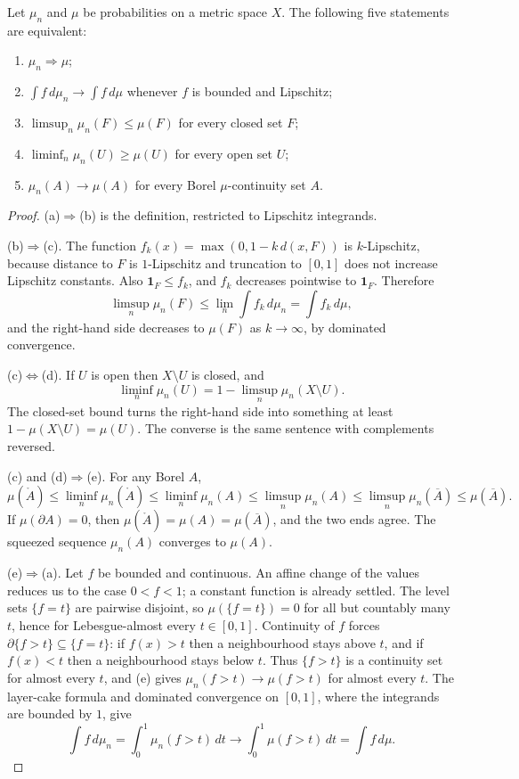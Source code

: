 \begin{theorem}[portmanteau]\label{thm:portmanteau}
Let $\mu_n$ and $\mu$ be probabilities on a metric space $X$. The following five statements are equivalent:
\begin{enumerate}[label=(\alph*)]
\item $\mu_n\Rightarrow\mu$;
\item $\int f\,d\mu_n\to\int f\,d\mu$ whenever $f$ is bounded and Lipschitz;
\item $\limsup_n\mu_n(F)\le\mu(F)$ for every closed set $F$;
\item $\liminf_n\mu_n(U)\ge\mu(U)$ for every open set $U$;
\item $\mu_n(A)\to\mu(A)$ for every Borel $\mu$-continuity set $A$.
\end{enumerate}
\end{theorem}
\begin{proof}
(a)$\Rightarrow$(b) is the definition, restricted to Lipschitz integrands.

(b)$\Rightarrow$(c). The function $f_k(x)=\max(0,1-k\,d(x,F))$ is $k$-Lipschitz, because distance to $F$ is $1$-Lipschitz and truncation to $[0,1]$
does not increase Lipschitz constants. Also $\mathbf 1_F\le f_k$, and $f_k$ decreases pointwise to $\mathbf 1_F$. Therefore
\[\limsup_n\mu_n(F)\le\lim_n\int f_k\,d\mu_n=\int f_k\,d\mu,\]
and the right-hand side decreases to $\mu(F)$ as $k\to\infty$, by dominated convergence.

(c)$\Leftrightarrow$(d). If $U$ is open then $X\setminus U$ is closed, and
\[\liminf_n\mu_n(U)=1-\limsup_n\mu_n(X\setminus U).\]
The closed-set bound turns the right-hand side into something at least $1-\mu(X\setminus U)=\mu(U)$. The converse is the same sentence with
complements reversed.

(c) and (d)$\Rightarrow$(e). For any Borel $A$,
\[\mu(\mathring A)\le\liminf_n\mu_n(\mathring A)\le\liminf_n\mu_n(A)\le\limsup_n\mu_n(A)\le\limsup_n\mu_n(\overline A)\le\mu(\overline A).\]
If $\mu(\partial A)=0$, then $\mu(\mathring A)=\mu(A)=\mu(\overline A)$, and the two ends agree. The squeezed sequence $\mu_n(A)$ converges to $\mu(A)$.

(e)$\Rightarrow$(a). Let $f$ be bounded and continuous. An affine change of the values reduces us to the case $0<f<1$; a constant function is
already settled. The level sets $\{f=t\}$ are pairwise disjoint, so $\mu(\{f=t\})=0$ for all but countably many $t$, hence for Lebesgue-almost
every $t\in[0,1]$. Continuity of $f$ forces $\partial\{f>t\}\subseteq\{f=t\}$: if $f(x)>t$ then a neighbourhood stays above $t$, and if $f(x)<t$
then a neighbourhood stays below $t$. Thus $\{f>t\}$ is a continuity set for almost every $t$, and (e) gives $\mu_n(f>t)\to\mu(f>t)$ for
almost every $t$. The layer-cake formula and dominated convergence on $[0,1]$, where the integrands are bounded by $1$, give
\[\int f\,d\mu_n=\int_0^1\mu_n(f>t)\,dt\to\int_0^1\mu(f>t)\,dt=\int f\,d\mu.\]
\end{proof}

